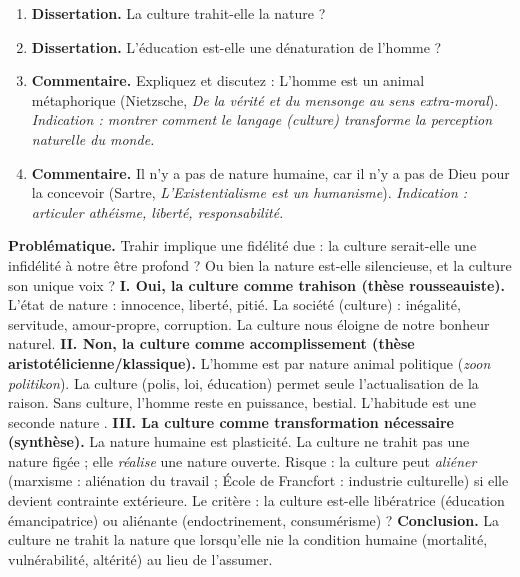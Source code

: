 \documentclass[11pt]{article}
\newcommand{\cle}[1]{{\popxbold\color{popdark}#1}}
\begin{document}
\begin{exercice}
\begin{enumerate}
\item \textbf{Dissertation.} \guillemotleft La culture trahit-elle la nature ? \guillemotright
\item \textbf{Dissertation.} \guillemotleft L'éducation est-elle une dénaturation de l'homme ? \guillemotright
\item \textbf{Commentaire.} Expliquez et discutez : \guillemotleft L'homme est un animal métaphorique \guillemotright (Nietzsche, \emph{De la vérité et du mensonge au sens extra-moral}). \textit{Indication : montrer comment le langage (culture) transforme la perception naturelle du monde.}
\item \textbf{Commentaire.} \guillemotleft Il n'y a pas de nature humaine, car il n'y a pas de Dieu pour la concevoir \guillemotright (Sartre, \emph{L'Existentialisme est un humanisme}). \textit{Indication : articuler athéisme, liberté, responsabilité.}
\end{enumerate}
\end{exercice}

\begin{corrige}
\textbf{Problématique.} \guillemotleft Trahir \guillemotright implique une fidélité due : la culture serait-elle une infidélité à notre être profond ? Ou bien la nature est-elle silencieuse, et la culture son unique voix ?
\textbf{I. Oui, la culture comme trahison (thèse rousseauiste).} L'état de nature : innocence, liberté, pitié. La société (culture) : inégalité, servitude, amour-propre, corruption. La culture nous éloigne de notre bonheur naturel.
\textbf{II. Non, la culture comme accomplissement (thèse aristotélicienne/klassique).} L'homme est par nature animal politique (\emph{zoon politikon}). La culture (polis, loi, éducation) permet seule l'actualisation de la raison. Sans culture, l'homme reste en puissance, bestial. \guillemotleft L'habitude est une seconde nature \guillemotright.
\textbf{III. La culture comme transformation nécessaire (synthèse).} La nature humaine est \cle{plasticité}. La culture ne trahit pas une nature figée ; elle \emph{réalise} une nature ouverte. Risque : la culture peut \emph{aliéner} (marxisme : aliénation du travail ; École de Francfort : industrie culturelle) si elle devient contrainte extérieure. Le critère : la culture est-elle \cle{libératrice} (éducation émancipatrice) ou \cle{aliénante} (endoctrinement, consumérisme) ?
\textbf{Conclusion.} La culture ne trahit la nature que lorsqu'elle nie la condition humaine (mortalité, vulnérabilité, altérité) au lieu de l'assumer.
\end{corrige}
\end{document}
